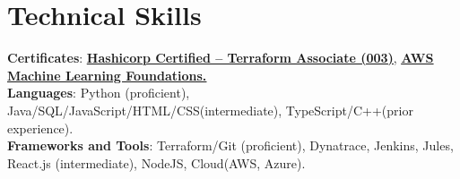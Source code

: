 \documentclass[letterpaper,10.5pt]{article}
\begin{document}
\section{Technical Skills}
 \begin{itemize}[leftmargin=0.0in, label={}]
    \small{\item{
     \textbf{Certificates}{: \underline{\href{https://www.credly.com/badges/52b619d0-9304-4a6f-bc22-3f05b057113c/linked_in_profile}{\textbf{Hashicorp Certified – Terraform Associate (003)}}}, \underline{\href{https://www.linkedin.com/posts/ayazhankad_aws-machine-learning-foundations-2022-activity-7001448530271772672-53pA?utm_source=share&utm_medium=member_desktop}{\textbf{AWS Machine Learning Foundations.}}}} \\
     \textbf{Languages}{: Python (proficient), Java/SQL/JavaScript/HTML/CSS(intermediate), TypeScript/C++(prior experience).} \\
     \textbf{Frameworks and Tools}{: Terraform/Git (proficient), Dynatrace, Jenkins, Jules, React.js (intermediate), NodeJS, Cloud(AWS, Azure).}}}
 \end{itemize}
\end{document}
